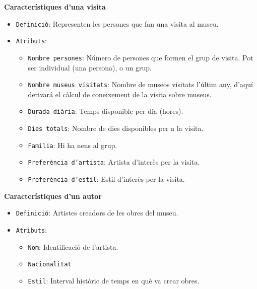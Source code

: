 \documentclass[a4paper]{article}
\begin{document}
	\noindent \textbf{Característiques d'una visita}
	\begin{itemize}
		\item \texttt{Definició}: Representen les persones que fan una visita al museu.
		\item \texttt{Atributs}:
		\begin{itemize}
			\item \texttt{Nombre persones}: Número de persones que formen el grup de visita. Pot ser individual (una persona), o un grup.
			\item \texttt{Nombre museus visitats}: Nombre de museos visitats l'últim any, d'aquí derivará el càlcul de coneixement de la visita sobre museus.
			\item \texttt{Durada diària}: Temps disponible per dia (hores).
			\item \texttt{Dies totals}: Nombre de dies disponibles per a la visita.
			\item \texttt{Familia}: Hi ha nens al grup.
			\item \texttt{Preferència d'artista}: Artista d'interès per la visita.
			\item \texttt{Preferència d'estil}: Estil d'interès per la visita.
		\end{itemize}
	\end{itemize}
		
		
	\noindent \textbf{Característiques d'un autor}
	\begin{itemize}
		\item \texttt{Definició}: Artistes creadors de les obres del museu.
		\item \texttt{Atributs}:
		\begin{itemize}
			\item \texttt{Nom}: Identificació de l’artista.
			\item \texttt{Nacionalitat}
			\item \texttt{Estil}: Interval històric de temps en què va crear obres.
			
		\end{itemize}
	\end{itemize}
	
\end{document}
